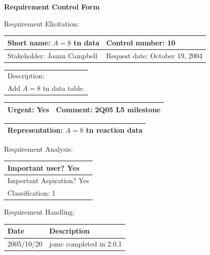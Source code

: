\begin{center}\Large\bf
Requirement Control Form
\end{center}
\vspace{24pt}

Requirement Elicitation:

\begin{tabular}{|p{211pt}|p{211pt}|} \hline
Short name: $A = 8$ tn data & Control number: 10\\ \hline
Stakeholder: Joann Campbell & Request date: October 19, 2004\\
\end{tabular}
\begin{tabular}{|p{433pt}|} \hline
Description: \\ 
Add $A=8$ tn data table. \\
\hline
\end{tabular} 
\begin{tabular}{|p{211pt}|p{211pt}|} \hline
Urgent: Yes & Comment: 2Q05 L5 milestone\\ \hline
\end{tabular}

\vspace{12pt}

\begin{tabular}{|p{433pt}|} \hline
Representation: $A=8$ tn reaction data \\ \hline
\end{tabular}
\vspace{24pt}

Requirement Analysis:

\begin{tabular}{|p{433pt}|} \hline
Important user? Yes \\ \hline
Important Aspiration? Yes \\ \hline
Classification: 1 \\ \hline
\end{tabular}
\vspace{24pt}

Requirement Handling:

\begin{tabular}{|p{72pt}|p{351pt}|} \hline
Date & Description \\ \hline
2005/10/20 & jomc completed in 2.0.1 \\ \hline
\end{tabular}
